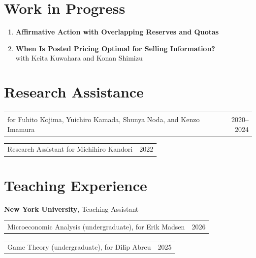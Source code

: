 \documentclass[11pt,letterpaper]{article}
\makeatletter
\newcommand{\cventry}[2]{%
  \begin{tabularx}{\textwidth}{@{}X r@{}}
    \begin{minipage}[t]{\linewidth}#1\end{minipage} & #2
  \end{tabularx}%
}
\makeatother
\begin{document}
\section*{Work in Progress}

\begin{enumerate}[leftmargin=1.5em, itemsep=6pt]

\item
\textbf{Affirmative Action with Overlapping Reserves and Quotas}

\item
\textbf{When Is Posted Pricing Optimal for Selling Information?}\\
with Keita Kuwahara and Konan Shimizu

\end{enumerate}

\section*{Research Assistance}

\cventry{
  Research Assistant at the University of Tokyo Market Design Center\\
  for Fuhito Kojima, Yuichiro Kamada, Shunya Noda, and Kenzo Imamura
}{2020--2024}

\vspace{5pt}

\cventry{
  Research Assistant for Michihiro Kandori
}{2022}

\section*{Teaching Experience}

\textbf{New York University}, Teaching Assistant\par\nopagebreak

\cventry{
  Microeconomic Analysis (undergraduate), for Erik Madsen
}{2026}

\vspace{5pt}

\cventry{
  Game Theory (undergraduate), for Dilip Abreu
}{2025}

\vspace{14pt}
\end{document}
